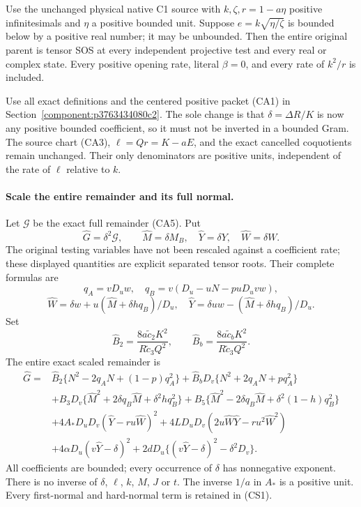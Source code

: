\begin{theorem}
Use the unchanged physical native C1 source with $k,\zeta,r=1-a\eta$
positive infinitesimals and $\eta$ a positive bounded unit. Suppose
$e=k\sqrt{\eta/\zeta}$ is bounded below by a positive real number;
it may be unbounded. Then the entire original parent is tensor SOS at
every independent projective test and every real or complex state.
Every positive opening rate, literal $\beta=0$, and every rate of
$k^2/r$ is included.
\end{theorem}

Use all exact definitions and the centered positive packet (CA1) in
Section~\ref{component:p3763434080c2}. The sole change is that
$\delta=\Delta R/K$ is now any positive bounded coefficient, so it
must not be inverted in a bounded Gram. The source chart (CA3),
$\ell=Qr=K-aE$, and the exact cancelled coquotients remain unchanged.
Their only denominators are positive units, independent of the rate
of $\ell$ relative to $k$.

\paragraph{Scale the entire remainder and its full normal.}
Let $\mathscr G$ be the exact full remainder (CA5). Put
\[
 \widehat G=\delta^2\mathscr G,\qquad
 \widehat M=\delta M_B,\quad \widehat Y=\delta Y,
 \quad\widehat W=\delta W.
\]
The original testing variables have not been rescaled against a
coefficient rate; these displayed quantities are explicit separated
tensor roots. Their complete formulas are
\[
 q_A=vD_uw,\quad q_B=v(D_u-uN-puD_uv w),
\]
\[
 \widehat W=\delta w+u(\widehat M+\delta hq_B)/D_u,
 \quad\widehat Y=\delta uw-(\widehat M+\delta hq_B)/D_u.
\]
Set
\[
 \widehat B_2=\frac{8a\widetilde c_2K^2}{R\widetilde c_3Q^2},
 \qquad
 \widehat B_b=\frac{8a\widetilde c_bK^2}{R\widetilde c_3Q^2}.
\]
The entire exact scaled remainder is
\begin{align*}
\widehat G={}&\widehat B_2\{N^2-2q_AN+(1-p)q_A^2\}
 +\widehat B_bD_v\{N^2+2q_AN+pq_A^2\}\\
&+B_3D_v\{\widehat M^2+2\delta q_B\widehat M+\delta^2hq_B^2\}
 +B_5\{\widehat M^2-2\delta q_B\widehat M+\delta^2(1-h)q_B^2\}\\
&+4A_*D_uD_v(\widehat Y-r u\widehat W)^2
 +4LD_uD_v(2u\widehat W\widehat Y-r u^2\widehat W^2)\\
&+4\alpha D_u(v\widehat Y-\delta)^2
 +2dD_u\{(v\widehat Y-\delta)^2-\delta^2D_v\}.
 \tag{CS1}
\end{align*}
All coefficients are bounded; every occurrence of $\delta$ has
nonnegative exponent. There is no inverse of $\delta$, $\ell$, $k$,
$M$, $J$ or $t$. The inverse $1/a$ in $A_*$ is a positive unit.
Every first-normal and hard-normal term is retained in (CS1).

